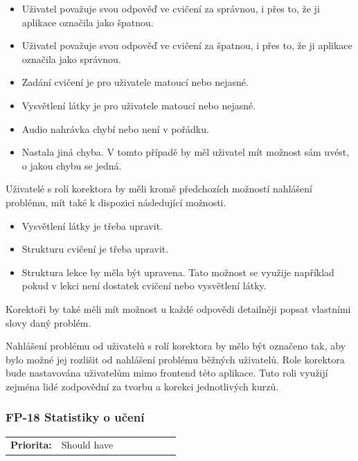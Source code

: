 \begin{itemize}
    \item Uživatel považuje svou odpověď ve cvičení za správnou, i přes to, že ji aplikace označila jako špatnou.
    \item Uživatel považuje svou odpověď ve cvičení za špatnou, i přes to, že ji aplikace označila jako správnou.
    \item Zadání cvičení je pro uživatele matoucí nebo nejasné.
    \item Vysvětlení látky je pro uživatele matoucí nebo nejasné.
    \item Audio nahrávka chybí nebo není v pořádku.
    \item Nastala jiná chyba. V tomto případě by měl uživatel mít možnost sám uvést, o jakou chybu se jedná.
\end{itemize}

Uživatelé s rolí korektora by měli kromě předchozích možností nahlášení problému, mít také k dispozici následující možnosti.

\begin{itemize}
    \item Vysvětlení látky je třeba upravit.
    \item Strukturu cvičení je třeba upravit.
    \item Struktura lekce by měla být upravena. Tato možnost se využije například pokud v lekci není dostatek cvičení nebo vysvětlení látky.
\end{itemize}

Korektoři by také měli mít možnost u každé odpovědi detailněji popsat vlastními slovy daný problém. 

Nahlášení problému od uživatelů s rolí korektora by mělo být označeno tak, aby bylo možné jej rozlišit od nahlášení problému běžných uživatelů. Role korektora bude nastavována uživatelům mimo frontend této aplikace. Tuto roli využijí zejména lidé zodpovědní za tvorbu a korekci jednotlivých kurzů.

\subsubsection{FP-18 Statistiky o učení}\label{sec:fp-learning-stats}

\begin{tabular}{lp{0.7\linewidth}}
    \textbf{Priorita:} & Should have \\
\end{tabular}

